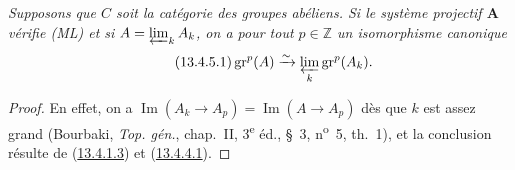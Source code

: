 \begin{corollary}[13.4.5]
\label{0.13.4.5-fr}
\emph{Supposons que $C$ soit la catégorie des groupes abéliens. Si le
système projectif $\mathbf A$ vérifie (ML) et si
$A=\varprojlim_k A_k$, on a pour tout $p\in\mathbb Z$ un isomorphisme
canonique}
\begin{equation}
\label{0.13.4.5.1-fr}
\tag{13.4.5.1}
\operatorname{gr}^p(A)\xrightarrow{\sim}
\varprojlim_k\operatorname{gr}^p(A_k).
\end{equation}
\end{corollary}
\begin{proof}
En effet, on a
$\operatorname{Im}(A_k\to A_p)=\operatorname{Im}(A\to A_p)$ dès que $k$
est assez grand (Bourbaki, \emph{Top. gén.}, chap.~II,
3\textsuperscript{e} éd., §~3, n\textsuperscript{o}~5, th.~1), et la
conclusion résulte de
(\hyperref[0.13.4.1.3-fr]{13.4.1.3}) et
(\hyperref[0.13.4.4.1-fr]{13.4.4.1}).
\end{proof}


